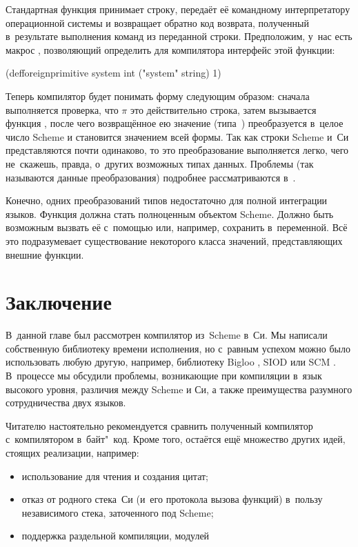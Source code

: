 Стандартная функция  принимает строку, передаёт её командному
интерпретатору операционной системы и возвращает обратно код возврата,
полученный в~результате выполнения команд из переданной строки. Предположим,
у~нас есть макрос , позволяющий определить для
компилятора интерфейс этой функции:

\begin{code:lisp}
(defforeignprimitive system int ("system" string) 1)
\end{code:lisp}

Теперь компилятор будет понимать форму  следующим образом:
сначала выполняется проверка, что $\pi$ это действительно строка, затем
вызывается функция , после чего возвращённое ею значение
(типа~) преобразуется в~целое число Scheme и становится значением всей
формы. Так как строки Scheme и~Си представляются почти одинаково, то это
преобразование выполняется легко, чего не~скажешь, правда, о~других возможных
типах данных. Проблемы  (так называются данные преобразования)
подробнее рассматриваются в~\cite{rm92,dps94a}.

Конечно, одних преобразований типов недостаточно для полной интеграции языков.
Функция  должна стать полноценным объектом Scheme. Должно быть
возможным вызвать её с~помощью  или, например, сохранить в~переменной.
Всё это подразумевает существование некоторого класса значений, представляющих
внешние функции.


\section{Заключение}\label{cc/sect:conclusions}

В~данной главе был рассмотрен компилятор из~Scheme в~Си. Мы написали собственную
библиотеку времени исполнения, но с~равным успехом можно было использовать любую
другую, например, библиотеку Bigloo \cite{ser94}, SIOD \cite{car94} или SCM
\cite{jaf94}. В~процессе мы обсудили проблемы, возникающие при компиляции в~язык
высокого уровня, различия между Scheme и Си, а также преимущества разумного
сотрудничества двух языков.

Читателю настоятельно рекомендуется сравнить полученный компилятор
с~компилятором в~байт"~код. Кроме того, остаётся ещё множество других идей,
стоящих реализации, например:

\begin{itemize}
  \item использование  для чтения и создания цитат;

  \item отказ от родного стека~Си (и~его протокола вызова функций)
        в~пользу независимого стека, заточенного под Scheme;

  \item поддержка раздельной компиляции, модулей {\itd}
\end{itemize}

